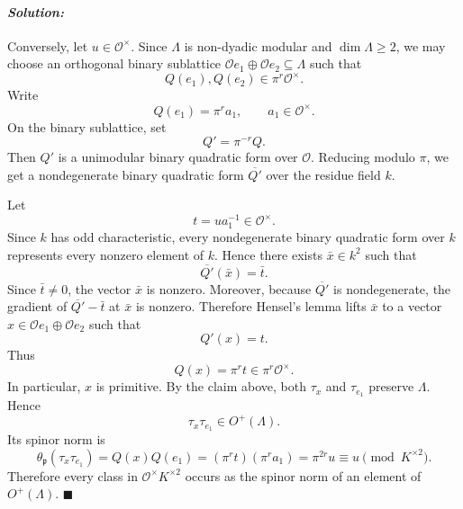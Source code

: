\documentclass[12pt, a4paper]{article}
\newenvironment{solution}
  {\paragraph{\textit{Solution:}}\par\medskip}
  {\hfill$\blacksquare$\vspace{0.1cm}}
\begin{document}
\begin{solution}
Conversely, let \(u\in \mathcal O^\times\). Since \(\Lambda\) is non-dyadic
modular and \(\dim\Lambda\ge 2\), we may choose an orthogonal binary sublattice
\(\mathcal O e_1\oplus \mathcal O e_2\subseteq \Lambda\) such that
\[
Q(e_1),Q(e_2)\in \pi^r\mathcal O^\times .
\]
Write
\[
Q(e_1)=\pi^r a_1,\qquad a_1\in \mathcal O^\times.
\]
On the binary sublattice, set
\[
Q'=\pi^{-r}Q.
\]
Then \(Q'\) is a unimodular binary quadratic form over \(\mathcal O\). Reducing
modulo \(\pi\), we get a nondegenerate binary quadratic form \(\overline{Q'}\)
over the residue field \(k\).

Let
\[
t=ua_1^{-1}\in \mathcal O^\times.
\]
Since \(k\) has odd characteristic, every nondegenerate binary quadratic form
over \(k\) represents every nonzero element of \(k\). Hence there exists
\(\bar x\in k^2\) such that
\[
\overline{Q'}(\bar x)=\bar t.
\]
Since \(\bar t\neq 0\), the vector \(\bar x\) is nonzero. Moreover, because
\(\overline{Q'}\) is nondegenerate, the gradient of
\(\overline{Q'}-\bar t\) at \(\bar x\) is nonzero. Therefore Hensel's lemma
lifts \(\bar x\) to a vector \(x\in \mathcal O e_1\oplus \mathcal O e_2\) such
that
\[
Q'(x)=t.
\]
Thus
\[
Q(x)=\pi^r t\in \pi^r\mathcal O^\times.
\]
In particular, \(x\) is primitive. By the claim above, both \(\tau_x\) and
\(\tau_{e_1}\) preserve \(\Lambda\). Hence
\[
\tau_x\tau_{e_1}\in O^+(\Lambda).
\]
Its spinor norm is
\[
\theta_{\mathfrak p}(\tau_x\tau_{e_1})
=
Q(x)Q(e_1)
=
(\pi^r t)(\pi^r a_1)
=
\pi^{2r}u
\equiv u
\pmod{K^{\times 2}}.
\]
Therefore every class in \(\mathcal O^\times K^{\times 2}\) occurs as the
spinor norm of an element of \(O^+(\Lambda)\).
\end{solution}
\end{document}
